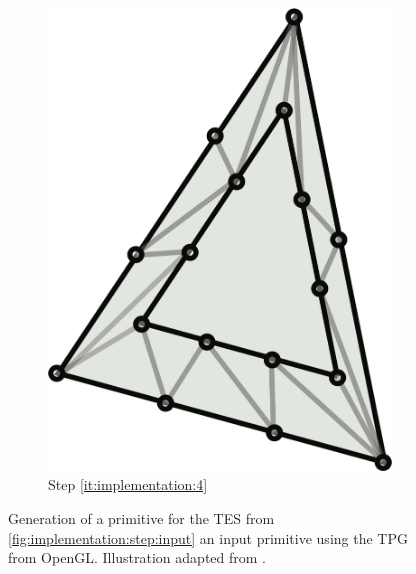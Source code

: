 \begin{figure}
\begin{subfigure}[b]{0.18\columnwidth}
		\includegraphics[width=\textwidth]{content/img/implementation/tessellation_4.png}
		\caption{Step \ref{it:implementation:4}}
		\label{fig:implementation:step:4}
	\end{subfigure}		
	\caption{Generation of a primitive for the TES  from  \ref{fig:implementation:step:input} an input primitive using the TPG from OpenGL. Illustration adapted from \cite{cozzi2012opengl}.}
	\label{fig:implementation:step}
\end{figure}

